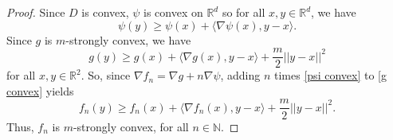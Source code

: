 \documentclass[10pt,a4paper]{amsart}
\newcommand{\bbN}{\mathbb{N}}
\newcommand{\bbR}{\mathbb{R}}
\begin{document}
\begin{proof}
    Since $D$ is convex, $\psi$ is convex on $\bbR^d$ so for all $x,y \in \bbR^d$, we have \begin{equation}\label{psi convex}
        \psi(y) \geq \psi(x) + \langle \nabla\psi(x), y-x \rangle.
    \end{equation}
    Since $g$ is $m$-strongly convex, we have \begin{equation}\label{g convex}
        g(y) \geq g(x) + \langle \nabla g(x), y-x \rangle + \frac{m}{2}||y-x||^2
    \end{equation} for all $x,y \in \bbR^2$.
    So, since $\nabla f_n = \nabla g + n \nabla\psi$, adding $n$ times \eqref{psi convex} to \eqref{g convex} yields \[
    f_n(y) \geq f_n(x) + \langle \nabla f_n(x), y-x\rangle + \frac{m}{2}||y-x||^2.
    \] Thus, $f_n$ is $m$-strongly convex, for all $n \in \bbN$.
\end{proof}
\end{document}
